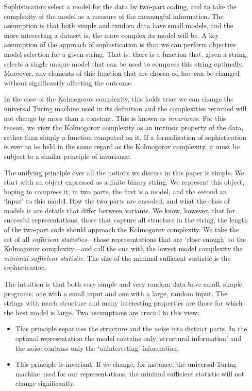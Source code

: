 \documentclass{style/llncs}
\begin{document}
Sophistication select a model for the data by two-part coding, and to take the complexity of the model as a measure of the meaningful information. The assumption is that both simple and random data have small models, and the more interesting a dataset is, the more complex its model will be. A key assumption of the approach of sophistication is that we can perform objective model selection for a given string. That is: there is a function that, given a string, selects a single unique model that can be used to compress this string optimally. Moreover, any elements of this function that are chosen ad hoc can be changed without significantly affecting the outcome.

In the case of the Kolmogorov complexity, this holds true; we can change the universal Turing machine used in its definition and the complexities returned will not change by more than a constant. This is known as \emph{invariance}. For this reason, we view the Kolmogorov complexity as an intrinsic property of the data, rather than simply a function computed on it. If a formalization of sophistication is ever to be held in the same regard as the Kolmogorov complexity, it must be subject to a similar principle of invariance. 

The unifying principle over all the notions we discuss in this paper is simple. We start with an object expressed as a finite binary string. We represent this object, hoping to compress it, in two parts, the first is a model, and the second an `input' to this model. How the two parts are encoded, and what the class of models is are details that differ between variants. We know, however, that for succesful representations, those that capture all structure in the string, the length of the two-part code should approach the Kolmogorov complexity. We take the set of all \emph{sufficient statistics}---those representations that are `close enough' to the Kolmogorov complexity---and call the one with the lowest model complexity the \emph{minimal sufficient statistic}. The size of the minimal sufficient statistic is the sophistication.

The intuition is that both very simple and very random data have small, simple programs: one with a small input and one with a large, random input. The strings with much structure and many interesting properties are those for which the best model is large. Two assumptions are crucial to this view:
\begin{itemize}
  \item This principle separates the structure and the noise into distinct parts. In the optimal representation the model contains only `structural information' and the noise contains only the `uninteresting' information.
  \item This principle is invariant. If we change, for instance, the universal Turing machine used for our representations, the minimal sufficient statistic will not change significantly.
\end{itemize} 
\end{document}
